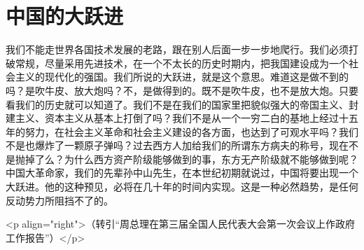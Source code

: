 \section[中国的大跃进（一九六四年十二月）]{中国的大跃进}


我们不能走世界各国技术发展的老路，跟在别人后面一步一步地爬行。我们必须打破常规，尽量采用先进技术，在一个不太长的历史时期内，把我国建设成为一个社会主义的现代化的强国。我们所说的大跃进，就是这个意思。难道这是做不到的吗？是吹牛皮、放大炮吗？不，是做得到的。既不是吹牛皮，也不是放大炮。只要看我们的历史就可以知道了。我们不是在我们的国家里把貌似强大的帝国主义、封建主义、资本主义从基本上打倒了吗？我们不是从一个一穷二白的基地上经过十五年的努力，在社会主义革命和社会主义建设的各方面，也达到了可观水平吗？我们不是也爆炸了一颗原子弹吗？过去西方人加给我们的所谓东方病夫的称号，现在不是抛掉了么？为什么西方资产阶级能够做到的事，东方无产阶级就不能够做到呢？中国大革命家，我们的先辈孙中山先生，在本世纪初期就说过，中国将要出现一个大跃进。他的这种预见，必将在几十年的时间内实现。这是一种必然趋势，是任何反动势力所阻挡不了的。

<p align="right">（转引“周总理在第三届全国人民代表大会第一次会议上作政府工作报告”）</p>


